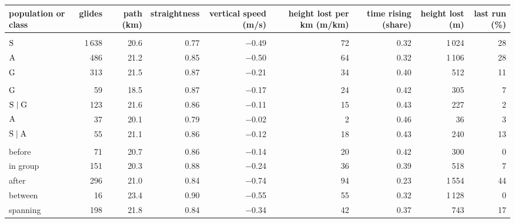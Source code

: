 \begin{tabular}{@{}l r r r r r r r r@{}}
\toprule
population or class & glides & path (km) & straightness & vertical speed (m/s) & height lost per km (m/km) & time rising (share) & height lost (m) & last run (\%) \\
\midrule
\addlinespace[2pt]\multicolumn{1}{@{}l}{\emph{raw}}\\
$\mathrm{S}$ & 1\,638 & 20.6 & 0.77 & $-$0.49 & 72 & 0.32 & 1\,024 & 28 \\
$\mathrm{A}$ & 486 & 21.2 & 0.85 & $-$0.50 & 64 & 0.32 & 1\,106 & 28 \\
$\mathrm{G}$ & 313 & 21.5 & 0.87 & $-$0.21 & 34 & 0.40 & 512 & 11 \\
\addlinespace[2pt]\multicolumn{1}{@{}l}{\emph{same route}}\\
$\mathrm{G}$ & 59 & 18.5 & 0.87 & $-$0.17 & 24 & 0.42 & 305 & 7 \\
$\mathrm{S}\mid\mathrm{G}$ & 123 & 21.6 & 0.86 & $-$0.11 & 15 & 0.43 & 227 & 2 \\
$\mathrm{A}$ & 37 & 20.1 & 0.79 & $-$0.02 & 2 & 0.46 & 36 & 3 \\
$\mathrm{S}\mid\mathrm{A}$ & 55 & 21.1 & 0.86 & $-$0.12 & 18 & 0.43 & 240 & 13 \\
\addlinespace[2pt]\multicolumn{1}{@{}l}{\emph{same flight}}\\
before & 71 & 20.7 & 0.86 & $-$0.14 & 20 & 0.42 & 300 & 0 \\
in group & 151 & 20.3 & 0.88 & $-$0.24 & 36 & 0.39 & 518 & 7 \\
after & 296 & 21.0 & 0.84 & $-$0.74 & 94 & 0.23 & 1\,554 & 44 \\
between & 16 & 23.4 & 0.90 & $-$0.55 & 55 & 0.32 & 1\,128 & 0 \\
spanning & 198 & 21.8 & 0.84 & $-$0.34 & 42 & 0.37 & 743 & 17 \\
\bottomrule
\end{tabular}
